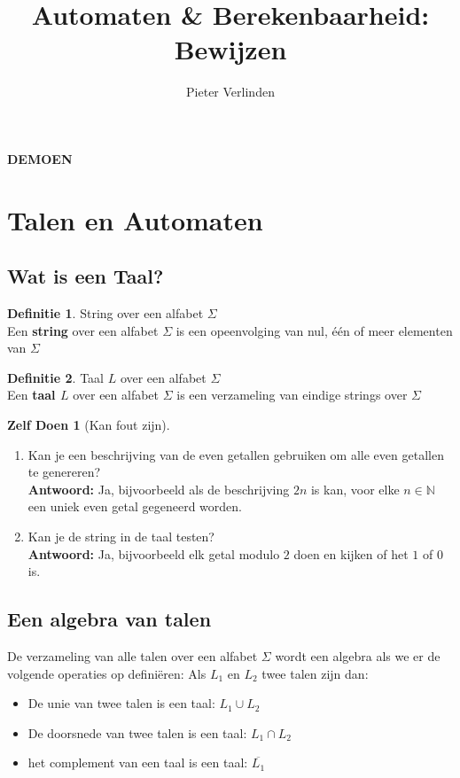 \documentclass[12pt,a4paper]{article}
\author{Pieter Verlinden}
\title{Automaten \& Berekenbaarheid: Bewijzen}
\theoremstyle{definition}
\newtheorem{defi}{Definitie}[section]
\newtheorem{zDoen}{Zelf Doen}[section]
\begin{document}
\textbf{\LARGE DEMOEN}
\section{Talen en Automaten}
	\subsection{Wat is een Taal?}
		\begin{defi}
			String over een alfabet $\Sigma$\\
			Een \textbf{string} over een alfabet $\Sigma$ is een opeenvolging van nul, één of meer elementen van $\Sigma$
		\end{defi}
	\begin{defi}
		Taal $L$ over een alfabet $\Sigma$\\
		Een \textbf{taal $L$} over een alfabet $\Sigma$ is een verzameling van eindige strings over $\Sigma$
	\end{defi}
	
	\begin{zDoen}[Kan fout zijn]
		\begin{enumerate}
			\item Kan je een beschrijving van de even getallen gebruiken om alle even getallen te genereren?\\
			\textbf{Antwoord:} Ja, bijvoorbeeld als de beschrijving $2n$ is kan, voor elke $n \in \mathbb{N}$ een uniek even getal gegeneerd worden.
			\item Kan je de string in de taal testen?\\
			\textbf{Antwoord:} Ja, bijvoorbeeld elk getal modulo $2$ doen en kijken of het $1$ of $0$ is.
		\end{enumerate}
	\end{zDoen}
	
	\subsection{Een algebra van talen}
		De verzameling van alle talen over een alfabet $\Sigma$ wordt een algebra als we er de volgende operaties op definiëren: 
			Als $L_1$ en $L_2$ twee talen zijn dan:
		\begin{itemize}
			\item De unie van twee talen is een taal: $L_1 \cup L_2$
			\item De doorsnede van twee talen is een taal: $L_1 \cap L_2$
			\item het complement van een taal is een taal: $\overline{L_1}$
		\end{itemize}
\end{document}
